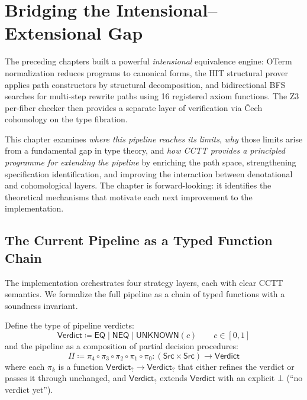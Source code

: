 \chapter{Bridging the Intensional--Extensional Gap}
\label{ch:fallback}

The preceding chapters built a powerful \emph{intensional}
equivalence engine: OTerm normalization reduces programs to canonical
forms, the HIT structural prover applies path constructors by
structural decomposition, and bidirectional BFS searches for
multi-step rewrite paths using 16 registered axiom functions.
The Z3 per-fiber checker then provides a separate layer of
verification via \v{C}ech cohomology on the type fibration.

This chapter examines \emph{where this pipeline reaches its limits},
\emph{why} those limits arise from a fundamental gap in type theory,
and \emph{how CCTT provides a principled programme for extending the
pipeline} by enriching the path space, strengthening specification
identification, and improving the interaction between denotational
and cohomological layers.  The chapter is forward-looking: it
identifies the theoretical mechanisms that motivate each next
improvement to the implementation.


\section{The Current Pipeline as a Typed Function Chain}
\label{sec:current-pipeline}

The implementation orchestrates four strategy layers, each with
clear CCTT semantics.  We formalize the full pipeline as a chain
of typed functions with a soundness invariant.

\begin{definition}
\label{def:pipeline-type}
Define the type of pipeline verdicts:
\[
  \mathsf{Verdict} \coloneqq \mathsf{EQ} \mid \mathsf{NEQ} \mid
  \mathsf{UNKNOWN}(c)
  \qquad c \in [0,1]
\]
and the pipeline as a composition of partial decision procedures:
\[
  \Pi \coloneqq \pi_4 \circ \pi_3 \circ \pi_2 \circ \pi_1 \circ \pi_0
  : (\mathsf{Src} \times \mathsf{Src}) \to \mathsf{Verdict}
\]
where each $\pi_k$ is a function
$\mathsf{Verdict}_? \to \mathsf{Verdict}_?$
that either refines the verdict or passes it through unchanged,
and $\mathsf{Verdict}_?$ extends $\mathsf{Verdict}$ with an
explicit $\bot$ (``no verdict yet'').
\end{definition}

